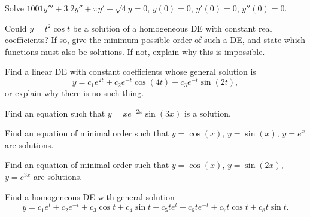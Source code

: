 \begin{exercise}\ansMark%
Solve $1001y'''+3.2y''+\pi y'-\sqrt{4} y = 0$, $y(0)=0$, $y'(0) = 0$,
$y''(0) = 0$.
\end{exercise}

\begin{exercise}
Could $y=t^2\cos t$ be a solution of a homogeneous DE with constant real coefficients? %
If so, give the minimum possible order of such a DE, and state which functions must also be solutions. If not, explain why this is impossible.
\end{exercise}

\begin{exercise}
Find a linear DE with constant coefficients whose general solution is $$y=c_1e^{2t}+ c_2e^{-t}\cos(4t) + c_3e^{-t}\sin(2t),$$ %
or explain why there is no such thing.
\end{exercise}

\begin{exercise}
Find an equation such that $y=xe^{-2x}\sin(3x)$ is a solution.
\end{exercise}

\begin{exercise}\ansMark%
Find an equation of minimal order such that $y=\cos(x)$, $y=\sin(x)$, $y=e^x$ are solutions.
\end{exercise}

\begin{exercise}
Find an equation of minimal order such that $y=\cos(x)$, $y=\sin(2x)$, $y=e^{3x}$ are solutions.
\end{exercise}

\begin{exercise}
Find a homogeneous DE with general solution %
$$y=c_1e^t+ c_2e^{-t}+ c_3\cos t+ c_4\sin t + c_5te^t+ c_6te^{-t}+ c_7t\cos t+ c_8t\sin t.$$
\end{exercise}



\setcounter{exercise}{100}

